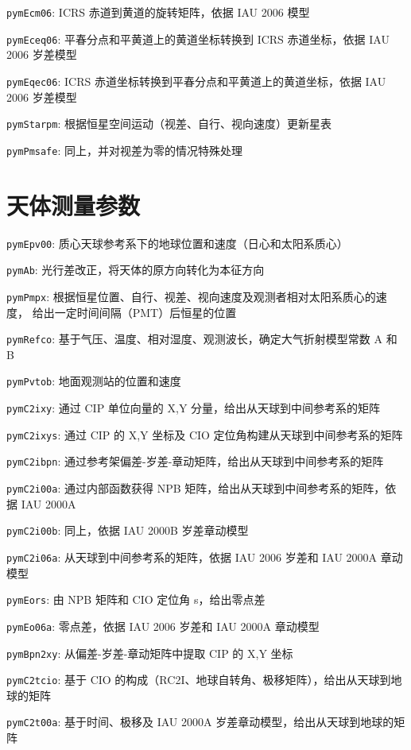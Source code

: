 \documentclass[11pt]{article}
\begin{document}
\texttt{pymEcm06}: ICRS 赤道到黄道的旋转矩阵，依据 IAU 2006 模型

\texttt{pymEceq06}: 平春分点和平黄道上的黄道坐标转换到 ICRS 赤道坐标，依据 IAU 2006 岁差模型

\texttt{pymEqec06}: ICRS 赤道坐标转换到平春分点和平黄道上的黄道坐标，依据 IAU 2006 岁差模型

\texttt{pymStarpm}: 根据恒星空间运动（视差、自行、视向速度）更新星表

\texttt{pymPmsafe}: 同上，并对视差为零的情况特殊处理

\newpage
\section{天体测量参数}

\texttt{pymEpv00}: 质心天球参考系下的地球位置和速度（日心和太阳系质心）

\texttt{pymAb}: 光行差改正，将天体的原方向转化为本征方向

\texttt{pymPmpx}: 根据恒星位置、自行、视差、视向速度及观测者相对太阳系质心的速度，
给出一定时间间隔（PMT）后恒星的位置

\texttt{pymRefco}: 基于气压、温度、相对湿度、观测波长，确定大气折射模型常数 A 和 B

\texttt{pymPvtob}: 地面观测站的位置和速度

\texttt{pymC2ixy}: 通过 CIP 单位向量的 X,Y 分量，给出从天球到中间参考系的矩阵

\texttt{pymC2ixys}: 通过 CIP 的 X,Y 坐标及 CIO 定位角构建从天球到中间参考系的矩阵

\texttt{pymC2ibpn}: 通过参考架偏差-岁差-章动矩阵，给出从天球到中间参考系的矩阵

\texttt{pymC2i00a}: 通过内部函数获得 NPB 矩阵，给出从天球到中间参考系的矩阵，依据 IAU 2000A

\texttt{pymC2i00b}: 同上，依据 IAU 2000B 岁差章动模型

\texttt{pymC2i06a}: 从天球到中间参考系的矩阵，依据 IAU 2006 岁差和 IAU 2000A 章动模型

\texttt{pymEors}: 由 NPB 矩阵和 CIO 定位角 s，给出零点差

\texttt{pymEo06a}: 零点差，依据 IAU 2006 岁差和 IAU 2000A 章动模型

\texttt{pymBpn2xy}: 从偏差-岁差-章动矩阵中提取 CIP 的 X,Y 坐标

\texttt{pymC2tcio}: 基于 CIO 的构成（RC2I、地球自转角、极移矩阵），给出从天球到地球的矩阵

\texttt{pymC2t00a}: 基于时间、极移及 IAU 2000A 岁差章动模型，给出从天球到地球的矩阵
\end{document}
